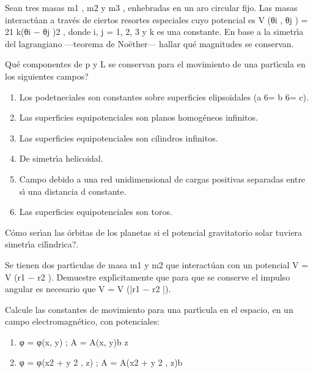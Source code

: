 \documentclass[10pt,oneside]{CBFT_book}
\begin{document}
\begin{ejercicios}

\label{ej1}
\item{ \bf }
Sean tres masas m1 , m2 y m3 , enhebradas en un aro circular fijo. Las masas interactúan
a través de ciertos resortes especiales cuyo potencial es V (θi , θj ) = 21 k(θi − θj )2 , donde
i, j = 1, 2, 3 y k es una constante. En base a la simetrı́a del lagrangiano —teorema de
Noëther— hallar qué magnitudes se conservan.

\label{ej2}
\item{ \bf }
Qué componentes de p y L se conservan para el movimiento de una partı́cula en los
siguientes campos?
\begin{enumerate}[label=(\alph*)]
\item Los podetneciales son constantes sobre superficies elipsoidales (a 6= b 6= c).
\item Las superficies equipotenciales son planos homogéneos infinitos.
\item Las superficies equipotenciales son cilindros infinitos.
\item De simetrı́a helicoidal.
\item Campo debido a una red unidimensional de cargas positivas separadas entre sı́
una distancia d constante.
\item Las superficies equipotenciales son toros.
\end{enumerate}


\label{ej3}
\item{ \bf }
Cómo serı́an las órbitas de los planetas si el potencial gravitatorio solar tuviera simetrı́a
cilı́ndrica?.


\label{ej4}
\item{ \bf }
Se tienen dos partı́culas de masa m1 y m2 que interactúan con un potencial V =
V (r1 − r2 ). Demuestre explı́citamente que para que se conserve el impulso angular es
necesario que V = V (|r1 − r2 |).


\label{ej5}
\item{ \bf }
Calcule las constantes de movimiento para una partı́cula en el espacio, en un campo
electromagnético, con potenciales:
\begin{enumerate}[label=(\alph*)]
\item  φ = φ(x, y) ; A = A(x, y)b z
\item  φ = φ(x2 + y 2 , z) ; A = A(x2 + y 2 , z)b
\end{enumerate}

\end{ejercicios}



% 

\end{document}
